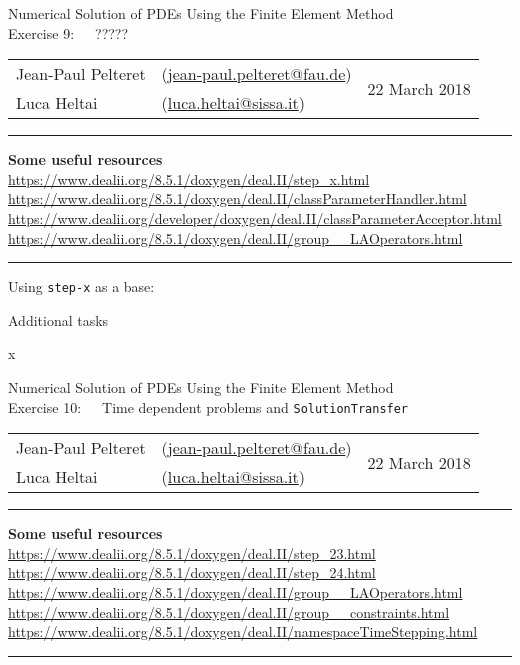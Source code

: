 \documentclass[11pt,answers]{exam}
\makeatletter
\newcommand{\makeheader}[3]{%
\setcounter{question}{0}
\begin{center}
{\sc Numerical Solution of PDEs Using the Finite Element Method}\vspace{2ex}\\
{\sc Exercise #1:\ \ \ #2}\vspace{2ex}\\
\begin{tabular*}{\textwidth}{ll @{\extracolsep{\fill}}r}
Jean-Paul Pelteret & (\url{jean-paul.pelteret@fau.de}) & \multirow{2}{*}{#3} \\
Luca Heltai & (\url{luca.heltai@sissa.it}) & \\
\end{tabular*}
\end{center}
}
\newcommand{\makeresources}[1]{%
\rule{\textwidth}{0.6mm}
\textbf{Some useful resources}\\[1.5ex]
#1 \par
\rule{\textwidth}{0.6mm}
}
\makeatother
\begin{document}
%
%
%
%
%
%




\clearpage
\makeheader{9}{?????}{22 March 2018}
\makeresources{%
\url{https://www.dealii.org/8.5.1/doxygen/deal.II/step_x.html} \\
\url{https://www.dealii.org/8.5.1/doxygen/deal.II/classParameterHandler.html} \\
\url{https://www.dealii.org/developer/doxygen/deal.II/classParameterAcceptor.html} \\
\url{https://www.dealii.org/8.5.1/doxygen/deal.II/group__LAOperators.html}
}

\begin{questions}

\question Using \verb|step-x| as a base:

\question Additional tasks
\begin{parts}
\bonuspart x
\end{parts}

\end{questions}




\clearpage
\makeheader{10}{Time dependent problems and \texttt{SolutionTransfer}}{22 March 2018}
\makeresources{%
\url{https://www.dealii.org/8.5.1/doxygen/deal.II/step_23.html} \\
\url{https://www.dealii.org/8.5.1/doxygen/deal.II/step_24.html} \\
\url{https://www.dealii.org/8.5.1/doxygen/deal.II/group__LAOperators.html} \\
\url{https://www.dealii.org/8.5.1/doxygen/deal.II/group__constraints.html} \\
\url{https://www.dealii.org/8.5.1/doxygen/deal.II/namespaceTimeStepping.html}
}
\end{document}
